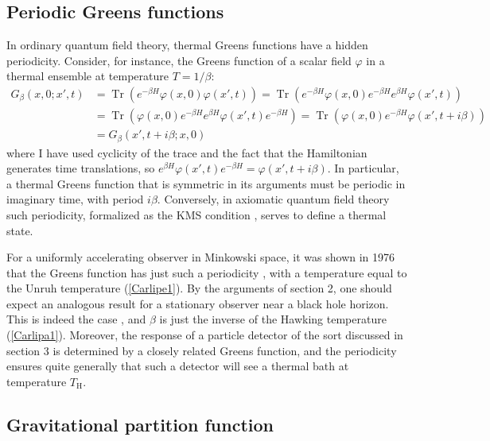 \documentclass[11pt]{article}
\begin{document}
\subsection{Periodic Greens functions \label{Greena}}

In ordinary quantum field theory,
thermal Greens functions have a hidden periodicity.  Consider, for
instance, the Greens function of a scalar field $\varphi$ in a thermal
ensemble at temperature $T = 1/\beta$:
\begin{align}
G_\beta(x,0;x',t) 
    &= \mathop{Tr}\left(e^{-\beta H}\varphi(x,0)\varphi(x',t)\right) 
    = \mathop{Tr}\left(e^{-\beta H}\varphi(x,0)e^{-\beta H}e^{\beta H}%
      \varphi(x',t)\right)\nonumber\\
   &=\mathop{Tr}\left(\varphi(x,0)e^{-\beta H}e^{\beta H}\varphi(x',t)%
  e^{-\beta H}\right) 
 =\mathop{Tr}\left(\varphi(x,0)e^{-\beta H}\varphi(x',t+i\beta)\right)\nonumber\\
 &= G_\beta(x',t+i\beta;x,0) \label{Carlipe6}
\end{align}
where I have used cyclicity of the trace and the fact that the 
Hamiltonian generates time translations, so 
$e^{\beta H}\varphi(x',t)e^{-\beta H} = \varphi(x',t+i\beta)$.  
In particular, a thermal Greens function that is symmetric in its arguments 
must be periodic in imaginary time, with period $i\beta$.  Conversely,
in axiomatic quantum field theory such periodicity, formalized
as the KMS condition \cite{Kubo,Martin,Haag}, serves to define
a thermal state.

For a uniformly accelerating observer in Minkowski space, it was
shown in 1976 that the Greens function has just such a periodicity
\cite{Bisognano}, with a temperature equal to the Unruh temperature
(\ref{Carlipe1}).  By the arguments of section 2, one
should expect an analogous result for a stationary observer
near a black hole horizon.  This is indeed the case \cite{Gibb,Gibc},
and  $\beta$ is just the inverse of the
Hawking temperature (\ref{Carlipa1}).  Moreover, the response of
a particle detector of the sort discussed in section 3
is determined by a closely related Greens function, and the
periodicity ensures quite generally that such a detector will see
a thermal bath at temperature $T_{\scriptscriptstyle\mathrm{H}}$.

\subsection{Gravitational partition function \label{parta}}
\end{document}
